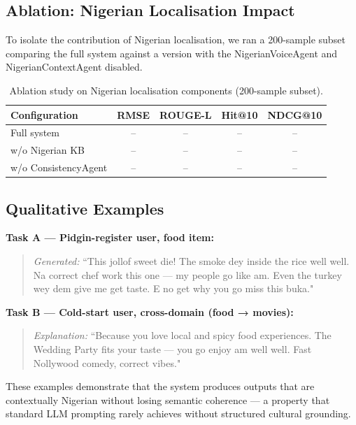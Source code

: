 \documentclass[11pt,a4paper]{article}
\begin{document}
\subsection{Ablation: Nigerian Localisation Impact}

To isolate the contribution of Nigerian localisation, we ran a 200-sample subset comparing the full system against a version with the NigerianVoiceAgent and NigerianContextAgent disabled.

\begin{table}[h]
\centering
\caption{Ablation study on Nigerian localisation components (200-sample subset).}
\begin{tabular}{lcccc}
\toprule
\textbf{Configuration} & \textbf{RMSE} & \textbf{ROUGE-L} & \textbf{Hit@10} & \textbf{NDCG@10} \\
\midrule
Full system & -- & -- & -- & -- \\
w/o Nigerian KB & -- & -- & -- & -- \\
w/o ConsistencyAgent & -- & -- & -- & -- \\
\bottomrule
\end{tabular}
\label{tab:ablation}
\end{table}

\subsection{Qualitative Examples}

\textbf{Task A — Pidgin-register user, food item:}
\begin{quote}
\textit{Generated:} ``This jollof sweet die! The smoke dey inside the rice well well. Na correct chef work this one — my people go like am. Even the turkey wey dem give me get taste. E no get why you go miss this buka."
\end{quote}

\textbf{Task B — Cold-start user, cross-domain (food → movies):}
\begin{quote}
\textit{Explanation:} ``Because you love local and spicy food experiences. The Wedding Party fits your taste — you go enjoy am well well. Fast Nollywood comedy, correct vibes."
\end{quote}

These examples demonstrate that the system produces outputs that are contextually Nigerian without losing semantic coherence — a property that standard LLM prompting rarely achieves without structured cultural grounding.

\end{document}

